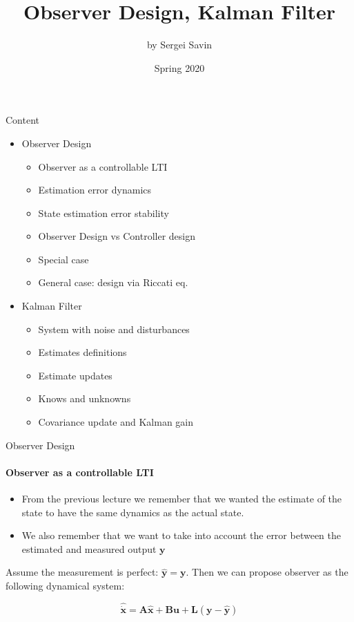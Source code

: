 \documentclass{beamer}
\title{Observer Design, Kalman Filter}
\author{by Sergei Savin}
\date{Spring 2020}
\begin{document}
\maketitle


\begin{frame}{Content}
\begin{itemize}
\item Observer Design
\begin{itemize}
\item Observer as a controllable LTI
\item Estimation error dynamics
\item State estimation error stability
\item Observer Design vs Controller design
\item Special case
\item General case: design via Riccati eq.
\end{itemize}

\item  Kalman Filter
\begin{itemize}
\item System with noise and disturbances
\item Estimates definitions
\item Estimate updates
\item Knows and unknowns
\item Covariance update and Kalman gain
\end{itemize}
\end{itemize}
\end{frame}

\begin{frame}{Observer Design}
\framesubtitle{Observer as a controllable LTI}
\begin{flushleft}


\begin{itemize}
\item From the previous lecture we remember that we wanted the estimate of the state to have the same dynamics as the actual state.
\item We also remember that we want to take into account the error between the estimated and measured output $\mathbf y$
\end{itemize}

\bigskip

Assume the measurement is perfect: $\hat{\mathbf y} = \mathbf y$. Then we can propose observer as the following dynamical system:

\[
\hat{\dot {\mathbf x}} = \mathbf A \hat{\mathbf x} + \mathbf B \mathbf u + \mathbf L(\mathbf y - \hat{\mathbf y})
\]

\end{flushleft}
\end{frame}
\end{document}
